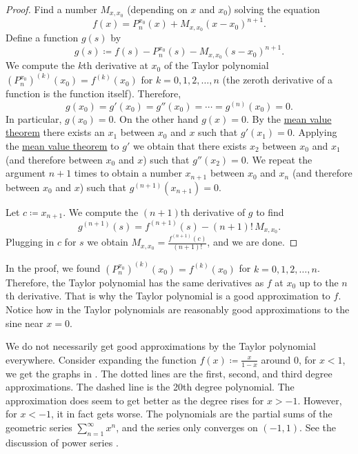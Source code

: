 \begin{proof}
Find a number $M_{x,x_0}$ (depending on $x$ and $x_0$) solving the equation
\begin{equation*}
f(x)=P_{n}^{x_0}(x)+M_{x,x_0}{(x-x_0)}^{n+1} .
\end{equation*}
Define a function $g(s)$ by
\begin{equation*}
g(s) \coloneqq f(s)-P_n^{x_0}(s)-M_{x,x_0}{(s-x_0)}^{n+1} .
\end{equation*}
We compute
the $k$th derivative at $x_0$ of the Taylor polynomial
${(P_n^{x_0})}^{(k)}(x_0) = f^{(k)}(x_0)$ for
$k=0,1,2,\ldots,n$ (the zeroth derivative of a function is the function
itself).  Therefore,
\begin{equation*}
g(x_0) = g'(x_0) = g''(x_0) = \cdots = g^{(n)}(x_0) = 0 .
\end{equation*}
In particular, $g(x_0) = 0$.
On the other hand $g(x) = 0$.  By the
\hyperref[thm:mvt]{mean value theorem}
there exists an $x_1$ between $x_0$ and $x$ such that $g'(x_1) = 0$.
Applying the \hyperref[thm:mvt]{mean value theorem}
to $g'$ we obtain that there exists
$x_2$ between $x_0$ and $x_1$ (and therefore between $x_0$ and $x$)
such that $g''(x_2) = 0$.  We repeat the
argument $n+1$ times to obtain a number $x_{n+1}$ between $x_0$ and $x_n$
(and therefore between $x_0$ and $x$) such that $g^{(n+1)}(x_{n+1}) = 0$.

Let $c \coloneqq x_{n+1}$.
We compute the $(n+1)$th derivative of $g$ to find
\begin{equation*}
g^{(n+1)}(s) = f^{(n+1)}(s)-(n+1)!\,M_{x,x_0} .
\end{equation*}
Plugging in $c$ for $s$ we obtain $M_{x,x_0} = \frac{f^{(n+1)}(c)}{(n+1)!}$, and
we are done.
\end{proof}

In the proof, we found
${(P_n^{x_0})}^{(k)}(x_0) = f^{(k)}(x_0)$ for $k=0,1,2,\ldots,n$.
Therefore, the Taylor polynomial has the same derivatives as $f$ at $x_0$
up to the $n$th derivative.  That is why the Taylor polynomial is
a good approximation to $f$.
Notice how in  the Taylor polynomials are
reasonably good approximations to the sine near $x=0$.

We do not necessarily get good approximations
by the Taylor polynomial everywhere.
Consider expanding the function
$f(x) \coloneqq \frac{x}{1-x}$ around 0,
for $x < 1$, we get the graphs in
.  The dotted lines are the first, second, and
third degree approximations.
The dashed line is the 20th degree polynomial.
The approximation does seem to get
better as the degree rises for $x > -1$.
However, for $x < -1$, it in fact gets worse.
The polynomials
are the partial sums of the geometric series $\sum_{n=1}^\infty x^n$,
and the series only converges on $(-1,1)$.
See the discussion of power series
.

